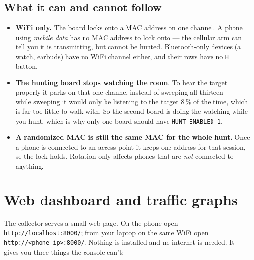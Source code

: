 \documentclass[11pt]{article}
\begin{document}
\subsection*{What it can and cannot follow}

\begin{itemize}
  \item \textbf{WiFi only.} The board locks onto a MAC address on one channel.
        A phone using \emph{mobile data} has no MAC address to lock onto --- the
        cellular arm can tell you it is transmitting, but cannot be hunted.
        Bluetooth-only devices (a watch, earbuds) have no WiFi channel either,
        and their rows have no \texttt{H} button.
  \item \textbf{The hunting board stops watching the room.} To hear the target
        properly it parks on that one channel instead of sweeping all thirteen
        --- while sweeping it would only be listening to the target 8\,\% of the
        time, which is far too little to walk with. So the second board is doing
        the watching while you hunt, which is why only one board should have
        \texttt{HUNT\_ENABLED 1}.
  \item \textbf{A randomized MAC is still the same MAC for the whole hunt.} Once
        a phone is connected to an access point it keeps one address for that
        session, so the lock holds. Rotation only affects phones that are
        \emph{not} connected to anything.
\end{itemize}

\section{Web dashboard and traffic graphs}

The collector serves a small web page. On the phone open
\texttt{http://localhost:8000/}; from your laptop on the same WiFi open
\texttt{http://<phone-ip>:8000/}. Nothing is installed and no internet is needed.
It gives you three things the console can't:
\end{document}
